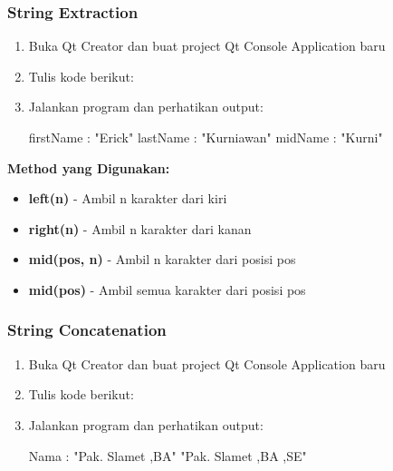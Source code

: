 \subsubsection{String Extraction}

\begin{enumerate}
\item Buka Qt Creator dan buat project Qt Console Application baru
\item Tulis kode berikut:



\item Jalankan program dan perhatikan output:

\begin{lcverbatim}
firstName : "Erick"
lastName : "Kurniawan"
midName : "Kurni"
\end{lcverbatim}
\end{enumerate}

\textbf{Method yang Digunakan:}
\begin{itemize}
\item \textbf{left(n)} - Ambil n karakter dari kiri
\item \textbf{right(n)} - Ambil n karakter dari kanan
\item \textbf{mid(pos, n)} - Ambil n karakter dari posisi pos
\item \textbf{mid(pos)} - Ambil semua karakter dari posisi pos
\end{itemize}

\subsubsection{String Concatenation}

\begin{enumerate}
\item Buka Qt Creator dan buat project Qt Console Application baru
\item Tulis kode berikut:



\item Jalankan program dan perhatikan output:

\begin{lcverbatim}
Nama : "Pak. Slamet ,BA"
"Pak. Slamet ,BA ,SE"
\end{lcverbatim}
\end{enumerate}


